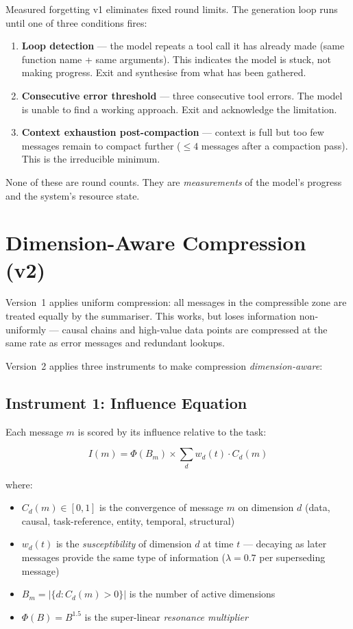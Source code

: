 \documentclass[11pt,a4paper]{article}
\begin{document}
Measured forgetting v1 eliminates fixed round limits. The generation loop runs until one of three conditions fires:

\begin{enumerate}
  \item \textbf{Loop detection} --- the model repeats a tool call it has already made (same function name + same arguments). This indicates the model is stuck, not making progress. Exit and synthesise from what has been gathered.
  \item \textbf{Consecutive error threshold} --- three consecutive tool errors. The model is unable to find a working approach. Exit and acknowledge the limitation.
  \item \textbf{Context exhaustion post-compaction} --- context is full but too few messages remain to compact further ($\leq 4$ messages after a compaction pass). This is the irreducible minimum.
\end{enumerate}

\noindent None of these are round counts. They are \emph{measurements} of the model's progress and the system's resource state.

\section{Dimension-Aware Compression (v2)}
\label{sec:v2}

Version~1 applies uniform compression: all messages in the compressible zone are treated equally by the summariser. This works, but loses information non-uniformly --- causal chains and high-value data points are compressed at the same rate as error messages and redundant lookups.

Version~2 applies three instruments to make compression \emph{dimension-aware}:

\subsection{Instrument 1: Influence Equation}

Each message $m$ is scored by its influence relative to the task:

\begin{equation}
I(m) = \Phi(B_m) \times \sum_{d} w_d(t) \cdot C_d(m)
\label{eq:influence}
\end{equation}

\noindent where:
\begin{itemize}[nosep]
  \item $C_d(m) \in [0, 1]$ is the convergence of message $m$ on dimension $d$ (data, causal, task-reference, entity, temporal, structural)
  \item $w_d(t)$ is the \emph{susceptibility} of dimension $d$ at time $t$ --- decaying as later messages provide the same type of information ($\lambda = 0.7$ per superseding message)
  \item $B_m = |\{d : C_d(m) > 0\}|$ is the number of active dimensions
  \item $\Phi(B) = B^{1.5}$ is the super-linear \emph{resonance multiplier}
\end{itemize}
\end{document}
